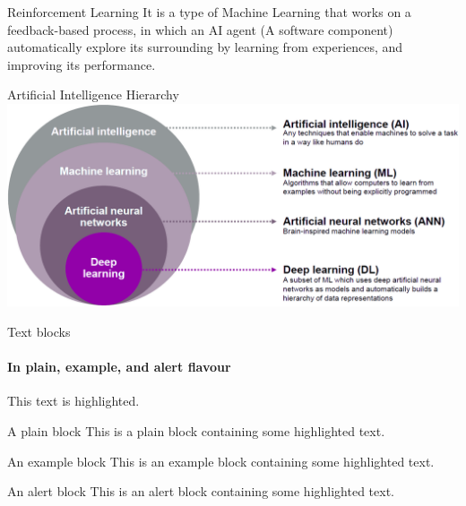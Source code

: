 \documentclass{beamer}
\begin{document}
    \begin{frame}[t]{Reinforcement Learning}
      \justifying It is a type of Machine Learning that works on a feedback-based process, in which an AI agent (A software component) automatically explore its surrounding by learning from experiences, and improving its performance.
    \end{frame}  
    
    \begin{frame}{Artificial Intelligence Hierarchy}
        \includegraphics{resources/hierarchy}
    \end{frame}
    \begin{frame}[label=simmonshall]{Text blocks}
      \framesubtitle{In plain, example, and \alert{alert} flavour}
      \alert{This text} is highlighted.

      \begin{block}{A plain block}
        This is a plain block containing some \alert{highlighted text}.
      \end{block}
      \begin{exampleblock}{An example block}
        This is an example block containing some \alert{highlighted text}.
      \end{exampleblock}
      \begin{alertblock}{An alert block}
        This is an alert block containing some \alert{highlighted text}.
      \end{alertblock}
    \end{frame}
\end{document}
